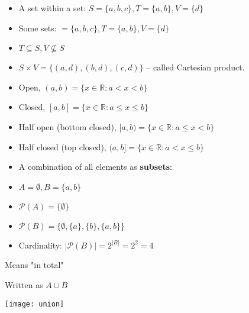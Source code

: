 \documentclass[english,10pt,a4paper]{article}
\begin{document}
\begin{theo}[Basic]
\begin{itemize}
\item A set within a set: $S=\{a, b, c\}, T = \{a, b \}, V=\{d\}$
\item Some sets: $=\{a, b, c \}	, T=\{a,b\}, V = \{d \}$
\item $T \subseteq S, V \not \subseteq S$
\item $S \times V = \{ (a,d), (b,d), (c,d)\}$ -- called Cartesian product.
\end{itemize}
\end{theo}


\begin{theo}[Intervals] 
\begin{itemize}
\item Open, $(a,b) = \{ x \in \mathbb{R}: a < x < b \}$
\item Closed, $[a,b] = \{ x \in \mathbb{R}: a \leq x \leq b \}$
\item Half open (bottom closed), $[a,b) = \{ x \in \mathbb{R}: a \leq x < b \}$
\item Half closed (top closed), $(a,b] = \{ x \in \mathbb{R}: a < x \leq b \}$
\end{itemize}
\end{theo}


\begin{theo} 
\begin{itemize}
\item A combination of all elements as \textbf{subsets}:
\item[] $A=\emptyset, B= \{a,b\}$
\item $\mathcal{P}(A) = \{\emptyset\} $
\item $\mathcal{P}(B) = \{\emptyset, \{a\}, \{b\}, \{a,b\} \}$
\item Cardinality: $|\mathcal{P}(B)| = 2^{|B|} = 2^2 = 4$
\end{itemize}
\end{theo}


\begin{theo}[Union] 
\begin{itemize}
\begin{minipage}{0.7\linewidth}
\item Means "in total"
\item Written as $A \cup B$
\end{minipage}
\hspace{0.25cm}
\begin{minipage}{0.25\linewidth}
\texttt{[image: union]} 
\end{minipage}
\end{itemize}

\end{theo}
\end{document}
